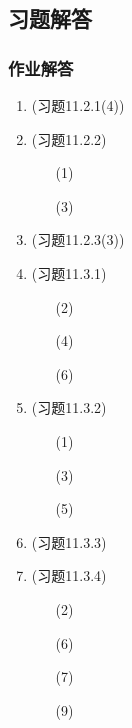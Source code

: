 \documentclass[a4paper,UTF8,fontset=windows,AutoFakeBold]{ctexart}
\theoremstyle{ex}
\begin{document}
\subsection{习题解答}
\subsubsection{作业解答}
\begin{enumerate}
    \item (习题11.2.1(4))
    \item (习题11.2.2)
    \begin{enumerate}
        \item[(1)] 
        \item[(3)] 
    \end{enumerate}
    \item (习题11.2.3(3))
    \item (习题11.3.1)
    \begin{enumerate}
        \item[(2)] 
        \item[(4)] 
        \item[(6)] 
    \end{enumerate}
    \item (习题11.3.2)
    \begin{enumerate}
        \item[(1)] 
        \item[(3)] 
        \item[(5)] 
    \end{enumerate}
    \item (习题11.3.3)
    \item (习题11.3.4)
    \begin{enumerate}
        \item[(2)] 
        \item[(6)] 
        \item[(7)] 
        \item[(9)] 
    \end{enumerate}
\end{enumerate}
\end{document}
